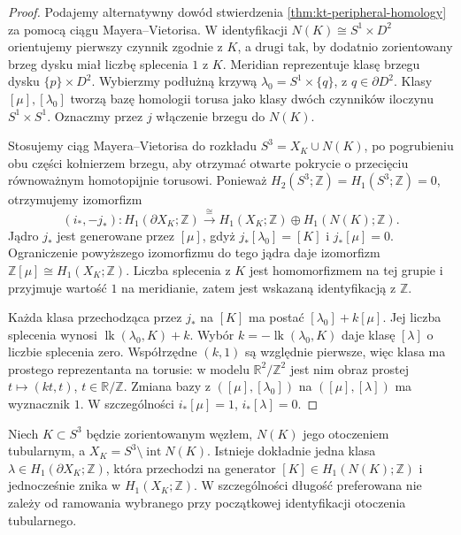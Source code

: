 \begin{proof}
Podajemy alternatywny dowód stwierdzenia
\ref{thm:kt-peripheral-homology} za pomocą ciągu
Mayera--Vietorisa. W identyfikacji $N(K)\cong S^1\times D^2$
orientujemy pierwszy czynnik zgodnie z $K$, a drugi
tak, by dodatnio zorientowany brzeg dysku miał
liczbę splecenia $1$ z $K$. Meridian reprezentuje
klasę brzegu dysku $\{p\}\times D^2$.
Wybierzmy podłużną
krzywą $\lambda_0=S^1\times\{q\}$, z $q\in\partial D^2$.
Klasy $[\mu],[\lambda_0]$ tworzą bazę homologii torusa
jako klasy dwóch czynników iloczynu $S^1\times S^1$.
Oznaczmy przez $j$ włączenie brzegu do $N(K)$.

Stosujemy ciąg Mayera--Vietorisa do rozkładu
$S^3=X_K\cup N(K)$, po pogrubieniu obu części
kołnierzem brzegu, aby otrzymać otwarte pokrycie
o przecięciu równoważnym homotopijnie torusowi.
Ponieważ $H_2(S^3;\mathbb Z)=H_1(S^3;\mathbb Z)=0$,
otrzymujemy izomorfizm
\[
(i_*,-j_*)\colon H_1(\partial X_K;\mathbb Z)
\xrightarrow{\ \cong\ }
H_1(X_K;\mathbb Z)\oplus H_1(N(K);\mathbb Z).
\]
Jądro $j_*$ jest generowane przez $[\mu]$, gdyż
$j_*[\lambda_0]=[K]$ i $j_*[\mu]=0$.
Ograniczenie powyższego izomorfizmu do tego jądra
daje izomorfizm $\mathbb Z[\mu]\cong H_1(X_K;\mathbb Z)$.
Liczba splecenia z $K$ jest homomorfizmem na tej grupie
i przyjmuje wartość $1$ na meridianie, zatem jest
wskazaną identyfikacją z $\mathbb Z$.

Każda klasa przechodząca przez $j_*$ na $[K]$ ma
postać $[\lambda_0]+k[\mu]$. Jej liczba splecenia
wynosi $\operatorname{lk}(\lambda_0,K)+k$.
Wybór $k=-\operatorname{lk}(\lambda_0,K)$ daje
klasę $[\lambda]$ o liczbie splecenia zero.
Współrzędne $(k,1)$ są względnie pierwsze, więc
klasa ma prostego reprezentanta na torusie:
w modelu $\mathbb R^2/\mathbb Z^2$ jest nim
obraz prostej $t\mapsto (kt,t)$, $t\in\mathbb R/\mathbb Z$.
Zmiana bazy z $([\mu],[\lambda_0])$ na
$([\mu],[\lambda])$ ma wyznacznik $1$.
W szczególności $i_*[\mu]=1$, $i_*[\lambda]=0$.
\end{proof}

\begin{stwierdzenie}
Niech $K\subset S^3$ będzie zorientowanym węzłem, $N(K)$ jego
otoczeniem tubularnym, a $X_K=S^3\setminus\operatorname{int}N(K)$.
Istnieje dokładnie jedna klasa $\lambda\in H_1(\partial X_K;\mathbb Z)$,
która przechodzi na generator $[K]\in H_1(N(K);\mathbb Z)$
i jednocześnie znika w $H_1(X_K;\mathbb Z)$.
W szczególności długość preferowana nie zależy od ramowania
wybranego przy początkowej identyfikacji otoczenia tubularnego.
\end{stwierdzenie}

